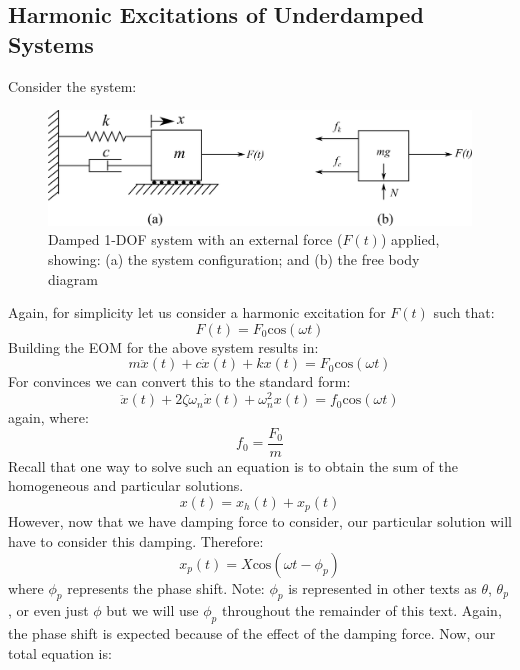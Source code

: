 \documentclass[12pt,letter]{article}
\numberwithin{ex}{section} %
\numberwithin{re}{section} %
\numberwithin{vcs}{section} %
\begin{document}
	
		\subsection{Harmonic Excitations of Underdamped Systems}

			Consider the system:
			\begin{figure}[H]
				\centering
				\includegraphics[]{../figures/1-DOF-spring_dashpot_mass_horizontal_forced_FBD.png}
				\caption{Damped 1-DOF system with an external force ($F(t)$) applied, showing: (a) the system configuration; and (b) the free body diagram}
			\end{figure}	
			\noindent Again, for simplicity let us consider a harmonic excitation for $F(t)$ such that:
			\begin{equation}
				F(t) = F_0\text{cos}(\omega t)
			\end{equation}							
			Building the EOM for the above system results in:
			\begin{equation}
				m \ddot{x}(t)+c\dot{x}(t)+kx(t) = F_0\text{cos}(\omega t)
			\end{equation}			
			For convinces we can convert this to the standard form:					
			\begin{equation}
				\ddot{x}(t)+2 \zeta \omega_n \dot{x}(t) +\omega_n^2x(t) = f_0\text{cos}(\omega t)
			\end{equation}					
			again, where:
			\begin{equation}
				f_0 = \frac{F_0}{m}
			\end{equation}	
			Recall that one way to solve such an equation is to obtain the sum of the homogeneous and particular solutions. 
			\begin{equation}
				x(t) = x_h(t) + x_p(t)
			\end{equation}	
			However, now that we have damping force to consider, our particular solution will have to consider this damping. Therefore:
			\begin{equation}
				\label{eq:x_p(t)}
				x_p(t) = X \text{cos}(\omega t - \phi_p)
			\end{equation}
			where $\phi_p$ represents the phase shift. Note: $\phi_p$ is represented in other texts as $\theta$, $\theta_p$, or even just $\phi$ but we will use $\phi_p$ throughout the remainder of this text. Again, the phase shift is expected because of the effect of the damping force. Now, our total equation is:
\end{document}
